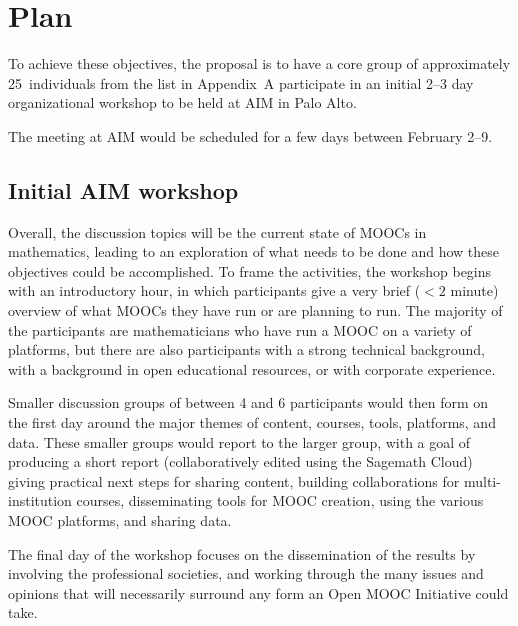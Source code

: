\documentclass[12pt]{amsart}
\begin{document}
\section{Plan}

To achieve these objectives, the proposal is to have a core group of
approximately 25~individuals from the list in Appendix~A participate
in an initial 2--3 day organizational workshop to be held at AIM in
Palo Alto.

The meeting at AIM would be scheduled for a few days between February
2--9.

\subsection{Initial AIM workshop}

Overall, the discussion topics will be the current state of MOOCs in
mathematics, leading to an exploration of what needs to be done and
how these objectives could be accomplished.  To frame the activities,
the workshop begins with an introductory hour, in which participants
give a very brief ($<2$ minute) overview of what MOOCs they have run
or are planning to run.  The majority of the participants are
mathematicians who have run a MOOC on a variety of platforms, but
there are also participants with a strong technical background, with a
background in open educational resources, or with corporate
experience.

Smaller discussion groups of between 4 and 6 participants would then
form on the first day around the major themes of content, courses,
tools, platforms, and data.  These smaller groups would report to the
larger group, with a goal of producing a short report (collaboratively
edited using the Sagemath Cloud) giving practical next steps for
sharing content, building collaborations for multi-institution
courses, disseminating tools for MOOC creation, using the various MOOC
platforms, and sharing data.

The final day of the workshop focuses on the dissemination of the
results by involving the professional societies, and working through
the many issues and opinions that will necessarily surround any form
an Open MOOC Initiative could take.

\newpage
\printbibliography
\end{document}
